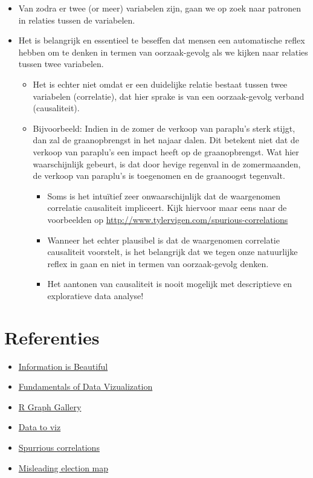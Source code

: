 \documentclass[]{tufte-book}
\providecommand{\tightlist}{%
  \setlength{\itemsep}{0pt}\setlength{\parskip}{0pt}}
\begin{document}
\begin{itemize}
\tightlist
\item
  Van zodra er twee (or meer) variabelen zijn, gaan we op zoek naar patronen in relaties tussen de variabelen.
\item
  Het is belangrijk en essentieel te beseffen dat mensen een automatische reflex hebben om te denken in termen van oorzaak-gevolg als we kijken naar relaties tussen twee variabelen.

  \begin{itemize}
  \tightlist
  \item
    Het is echter niet omdat er een duidelijke relatie bestaat tussen twee variabelen (correlatie), dat hier sprake is van een oorzaak-gevolg verband (causaliteit).
  \item
    Bijvoorbeeld: Indien in de zomer de verkoop van paraplu's sterk stijgt, dan zal de graanopbrengst in het najaar dalen. Dit betekent niet dat de verkoop van paraplu's een impact heeft op de graanopbrengst. Wat hier waarschijnlijk gebeurt, is dat door hevige regenval in de zomermaanden, de verkoop van paraplu's is toegenomen en de graanoogst tegenvalt.

    \begin{itemize}
    \tightlist
    \item
      Soms is het intuïtief zeer onwaarschijnlijk dat de waargenomen correlatie causaliteit impliceert. Kijk hiervoor maar eens naar de voorbeelden op \url{http://www.tylervigen.com/spurious-correlations}
    \item
      Wanneer het echter plausibel is dat de waargenomen correlatie causaliteit voorstelt, is het belangrijk dat we tegen onze natuurlijke reflex in gaan en niet in termen van oorzaak-gevolg denken.
    \item
      Het aantonen van causaliteit is nooit mogelijk met descriptieve en exploratieve data analyse!
    \end{itemize}
  \end{itemize}
\end{itemize}

\hypertarget{referenties-1}{%
\section{Referenties}\label{referenties-1}}

\begin{itemize}
\tightlist
\item
  \href{https://informationisbeautiful.net/}{Information is Beautiful}
\item
  \href{https://serialmentor.com/dataviz/}{Fundamentals of Data Vizualization}
\item
  \href{https://www.r-graph-gallery.com/}{R Graph Gallery}
\item
  \href{https://www.data-to-viz.com/}{Data to viz}
\item
  \href{https://www.tylervigen.com/spurious-correlations}{Spurrious correlations}
\item
  \href{https://edition.cnn.com/2020/01/17/politics/donald-trump-2016-map-county-by-county/index.html}{Misleading election map}
\end{itemize}
\end{document}
